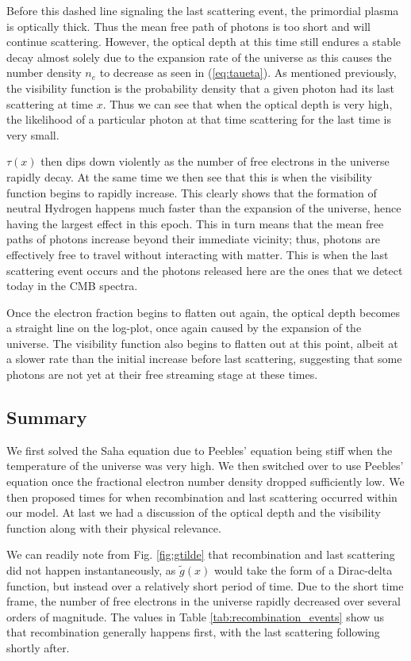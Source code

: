 \documentclass[%
reprint,
 amsmath,amssymb,
 aps,
]{revtex4-2}
\begin{document}
Before this dashed line signaling the last scattering event, the primordial plasma is optically thick. Thus the mean free path of photons is too short and will continue scattering. However, the optical depth at this time still endures a stable decay almost solely due to the expansion rate of the universe as this causes the number density $n_e$ to decrease as seen in (\ref{eq:taueta}). As mentioned previously, the visibility function is the probability density that a given photon had its last scattering at time $x$. Thus we can see that when the optical depth is very high, the likelihood of a particular photon at that time scattering for the last time is very small. 

$\tau(x)$ then dips down violently as the number of free electrons in the universe rapidly decay. At the same time we then see that this is when the visibility function begins to rapidly increase. This  clearly shows that the formation of neutral Hydrogen happens much faster than the expansion of the universe, hence having the largest effect in this epoch. This in turn means that the mean free paths of photons increase beyond their immediate vicinity; thus, photons are effectively free to travel without interacting with matter. This is when the last scattering event occurs and the photons released here are the ones that we detect today in the CMB spectra. 

Once the electron fraction begins to flatten out again, the optical depth becomes a straight line on the log-plot, once again caused by the expansion of the universe. The visibility function also begins to flatten out at this point, albeit at a slower rate than the initial increase before last scattering, suggesting that some photons are not yet at their free streaming stage at these times.


\subsection{Summary}
We first solved the Saha equation due to Peebles' equation being stiff when the temperature of the universe was very high. We then switched over to use Peebles' equation once the fractional electron number density dropped sufficiently low. We then proposed times for when recombination and last scattering occurred within our model. At last we had a discussion of the optical depth and the visibility function along with their physical relevance.

We can readily note from Fig. \ref{fig:gtilde} that recombination and last scattering did not happen instantaneously, as $\tilde g(x)$ would take the form of a Dirac-delta function, but instead over a relatively short period of time. Due to the short time frame, the number of free electrons in the universe rapidly decreased over several orders of magnitude. The values in Table \ref{tab:recombination_events} show us that recombination generally happens first, with the last scattering following shortly after.
\end{document}
